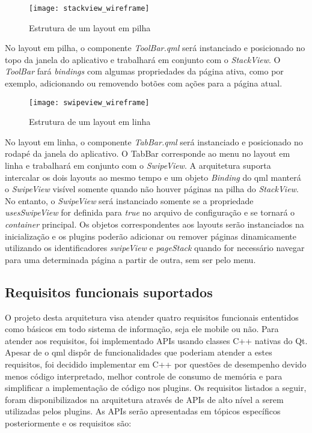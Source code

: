 \begin{figure}[H]
	\texttt{[image: stackview\_wireframe]}
	\centering
	\caption{Estrutura de um layout em pilha}
\end{figure}

No layout em pilha, o componente \textit{ToolBar.qml} será instanciado e posicionado no topo da janela do aplicativo e trabalhará em conjunto com o \textit{StackView}. O \textit{ToolBar} fará \textit{bindings} com algumas propriedades da página ativa, como por exemplo, adicionando ou removendo botões com ações para a página atual.

\begin{figure}[H]
	\texttt{[image: swipeview\_wireframe]}
	\centering
	\caption{Estrutura de um layout em linha}
\end{figure}

No layout em linha, o componente \textit{TabBar.qml} será instanciado e posicionado no rodapé da janela do aplicativo. O TabBar corresponde ao menu no layout em linha e trabalhará em conjunto com o \textit{SwipeView}. A arquitetura suporta intercalar os dois layouts ao mesmo tempo e um objeto \textit{Binding} do qml manterá o \textit{SwipeView} visível somente quando não houver páginas na pilha do \textit{StackView}. No entanto, o \textit{SwipeView} será instanciado somente se a propriedade \textit{usesSwipeView} for definida para \textit{true} no arquivo de configuração e se tornará o \textit{container} principal. Os objetos correspondentes aos layouts serão instanciados na inicialização e os plugins poderão adicionar ou remover páginas dinamicamente utilizando os identificadores \textit{swipeView} e \textit{pageStack} quando for necessário navegar para uma determinada página a partir de outra, sem ser pelo menu.\par


\subsection{Requisitos funcionais suportados}
O projeto desta arquitetura visa atender quatro requisitos funcionais ententidos como básicos em todo sistema de informação, seja ele mobile ou não. Para atender aos requisitos, foi implementado APIs usando classes C++ nativas do Qt. Apesar de o qml dispôr de funcionalidades que poderiam atender a estes requisitos, foi decidido implementar em C++ por questões de desempenho devido menos código interpretado, melhor controle de consumo de memória e para simplificar a implementação de código nos plugins. Os requisitos listados a seguir, foram disponibilizados na arquitetura através de APIs de alto nível a serem utilizadas pelos plugins. As APIs serão apresentadas em tópicos específicos posteriormente e os requisitos são:

